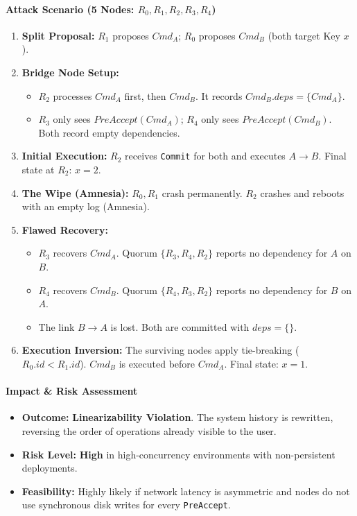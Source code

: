 \documentclass{article}
\theoremstyle{plain}
\theoremstyle{definition}
\theoremstyle{remark}
\begin{document}
{\paragraph{Attack Scenario (5 Nodes: $R_0, R_1, R_2, R_3, R_4$)}
\begin{enumerate}
    \item \textbf{Split Proposal:} $R_1$ proposes $Cmd_A$; $R_0$ proposes $Cmd_B$ (both target Key $x$).
    \item \textbf{Bridge Node Setup:} 
        \begin{itemize}
            \item $R_2$ processes $Cmd_A$ first, then $Cmd_B$. It records $Cmd_B.deps = \{Cmd_A\}$.
            \item $R_3$ only sees $PreAccept(Cmd_A)$; $R_4$ only sees $PreAccept(Cmd_B)$. Both record empty dependencies.
        \end{itemize}
    \item \textbf{Initial Execution:} $R_2$ receives \texttt{Commit} for both and executes $A \rightarrow B$. Final state at $R_2$: $x=2$.
    \item \textbf{The Wipe (Amnesia):} $R_0, R_1$ crash permanently. $R_2$ crashes and reboots with an empty log (Amnesia).
    \item \textbf{Flawed Recovery:} 
        \begin{itemize}
            \item $R_3$ recovers $Cmd_A$. Quorum $\{R_3, R_4, R_2\}$ reports no dependency for $A$ on $B$.
            \item $R_4$ recovers $Cmd_B$. Quorum $\{R_4, R_3, R_2\}$ reports no dependency for $B$ on $A$.
            \item The link $B \rightarrow A$ is lost. Both are committed with $deps = \{\}$.
        \end{itemize}
    \item \textbf{Execution Inversion:} The surviving nodes apply tie-breaking ($R_0.id < R_1.id$). $Cmd_B$ is executed before $Cmd_A$. Final state: $x=1$.
\end{enumerate}

\paragraph{Impact \& Risk Assessment}
\begin{itemize}
    \item \textbf{Outcome:} \textbf{Linearizability Violation}. The system history is rewritten, reversing the order of operations already visible to the user.
    \item \textbf{Risk Level:} \textbf{High} in high-concurrency environments with non-persistent deployments.
    \item \textbf{Feasibility:} Highly likely if network latency is asymmetric and nodes do not use synchronous disk writes for every \texttt{PreAccept}.
\end{itemize}

}
\end{document}
